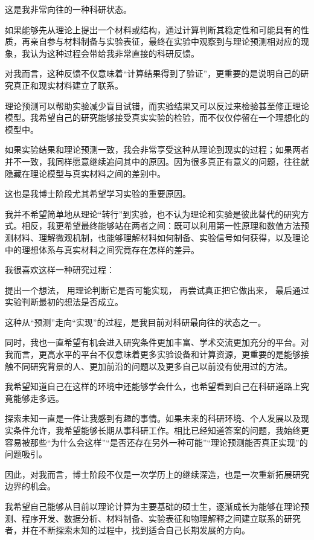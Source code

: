 这是我非常向往的一种科研状态。

如果能够先从理论上提出一个材料或结构，通过计算判断其稳定性和可能具有的性质，再亲自参与材料制备与实验表征，最终在实验中观察到与理论预测相对应的现象，我认为这种过程会带给我非常直接的科研反馈。

对我而言，这种反馈不仅意味着“计算结果得到了验证”，更重要的是说明自己的研究真正和现实材料建立了联系。

理论预测可以帮助实验减少盲目试错，而实验结果又可以反过来检验甚至修正理论模型。我希望自己的研究能够接受真实实验的检验，而不仅仅停留在一个理想化的模型中。

如果实验结果和理论预测一致，我会非常享受这种从理论到现实的过程；如果两者并不一致，我同样愿意继续追问其中的原因。因为很多真正有意义的问题，往往就隐藏在理论模型与真实材料之间的差别中。

这也是我博士阶段尤其希望学习实验的重要原因。

我并不希望简单地从理论“转行”到实验，也不认为理论和实验是彼此替代的研究方式。相反，我更希望最终能够站在两者之间：既可以利用第一性原理和数值方法预测材料、理解微观机制，也能够理解材料如何制备、实验信号如何获得，以及理论中的理想体系与真实材料之间究竟存在怎样的差异。

我很喜欢这样一种研究过程：

提出一个想法， 用理论判断它是否可能实现， 再尝试真正把它做出来， 最后通过实验判断最初的想法是否成立。

这种从“预测”走向“实现”的过程，是我目前对科研最向往的状态之一。

同时，我也一直希望有机会进入研究条件更加丰富、学术交流更加充分的平台。对我而言，更高水平的平台不仅意味着更多实验设备和计算资源，更重要的是能够接触不同研究背景的人、更加前沿的问题以及更多自己以前没有使用过的方法。

我希望知道自己在这样的环境中还能够学会什么，也希望看到自己在科研道路上究竟能够走多远。

探索未知一直是一件让我感到有趣的事情。如果未来的科研环境、个人发展以及现实条件允许，我希望能够长期从事科研工作。相比已经知道答案的问题，我始终更容易被那些“为什么会这样”“是否还存在另外一种可能”“理论预测能否真正实现”的问题吸引。

因此，对我而言，博士阶段不仅是一次学历上的继续深造，也是一次重新拓展研究边界的机会。

我希望自己能够从目前以理论计算为主要基础的硕士生，逐渐成长为能够在理论预测、程序开发、数据分析、材料制备、实验表征和物理解释之间建立联系的研究者，并在不断探索未知的过程中，找到适合自己长期发展的方向。
